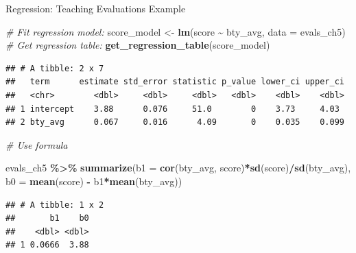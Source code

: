 \documentclass[
  ignorenonframetext,
]{beamer}
\newenvironment{Shaded}{\begin{snugshade}}{\end{snugshade}}
\newcommand{\AttributeTok}[1]{\textcolor[rgb]{0.13,0.29,0.53}{#1}}
\newcommand{\CommentTok}[1]{\textcolor[rgb]{0.56,0.35,0.01}{\textit{#1}}}
\newcommand{\FunctionTok}[1]{\textcolor[rgb]{0.13,0.29,0.53}{\textbf{#1}}}
\newcommand{\NormalTok}[1]{#1}
\newcommand{\OtherTok}[1]{\textcolor[rgb]{0.56,0.35,0.01}{#1}}
\newcommand{\SpecialCharTok}[1]{\textcolor[rgb]{0.81,0.36,0.00}{\textbf{#1}}}
\begin{document}
\begin{frame}[fragile]{Regression: Teaching Evaluations Example}
\protect\hypertarget{regression-teaching-evaluations-example-2}{}
\tiny

\begin{Shaded}
\begin{Highlighting}[]
\CommentTok{\# Fit regression model:}
\NormalTok{score\_model }\OtherTok{\textless{}{-}} \FunctionTok{lm}\NormalTok{(score }\SpecialCharTok{\textasciitilde{}}\NormalTok{ bty\_avg, }\AttributeTok{data =}\NormalTok{ evals\_ch5)}
\CommentTok{\# Get regression table:}
\FunctionTok{get\_regression\_table}\NormalTok{(score\_model)}
\end{Highlighting}
\end{Shaded}

\begin{verbatim}
## # A tibble: 2 x 7
##   term      estimate std_error statistic p_value lower_ci upper_ci
##   <chr>        <dbl>     <dbl>     <dbl>   <dbl>    <dbl>    <dbl>
## 1 intercept    3.88      0.076     51.0        0    3.73     4.03 
## 2 bty_avg      0.067     0.016      4.09       0    0.035    0.099
\end{verbatim}

\begin{Shaded}
\begin{Highlighting}[]
\CommentTok{\# Use formula}

\NormalTok{evals\_ch5 }\SpecialCharTok{\%\textgreater{}\%} 
  \FunctionTok{summarize}\NormalTok{(}\AttributeTok{b1 =} \FunctionTok{cor}\NormalTok{(bty\_avg, score)}\SpecialCharTok{*}\FunctionTok{sd}\NormalTok{(score)}\SpecialCharTok{/}\FunctionTok{sd}\NormalTok{(bty\_avg),}
            \AttributeTok{b0 =} \FunctionTok{mean}\NormalTok{(score) }\SpecialCharTok{{-}}\NormalTok{ b1}\SpecialCharTok{*}\FunctionTok{mean}\NormalTok{(bty\_avg))}
\end{Highlighting}
\end{Shaded}

\begin{verbatim}
## # A tibble: 1 x 2
##       b1    b0
##    <dbl> <dbl>
## 1 0.0666  3.88
\end{verbatim}

\normalsize
\end{frame}
\end{document}
